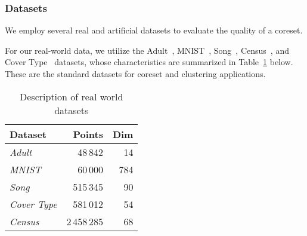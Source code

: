 \subsubsection{Datasets}

We employ several real and artificial datasets to evaluate the quality of a coreset. 

For our real-world data, we utilize the Adult~\cite{Dua:2019}, MNIST~\cite{mnist}, Song~\cite{song}, Census~\cite{census}, and Cover Type~\cite{covtype}
datasets, whose characteristics are summarized in Table~\ref{tbl:datasets} below. These are the standard datasets for coreset and clustering applications.

\begin{table}[htbp]
    \centering
    \begin{tabular}{lrr}
        Dataset & Points & Dim \\
        \hline
        \emph{Adult} & 48\,842 & 14 \\
        \emph{MNIST} & 60\,000 & 784 \\
        \emph{Song} & 515\,345 & 90 \\
        \emph{Cover Type} & 581\,012 & 54 \\
        \emph{Census} & 2\,458\,285 & 68
    \end{tabular}
    \caption{Description of real world datasets}
        \label{tbl:datasets}
\end{table}

